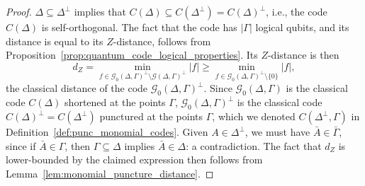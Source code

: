 \documentclass{article}
\begin{document}
\begin{proof}
    $\Delta \subseteq \Delta^\perp$ implies that $C(\Delta) \subseteq C(\Delta^\perp) = C(\Delta)^\perp$, i.e., the code $C(\Delta)$ is self-orthogonal. The fact that the code has $|\Gamma|$ logical qubits, and its distance is equal to its $Z$-distance, follows from Proposition~\ref{prop:quantum_code_logical_properties}. Its $Z$-distance is then
    \begin{equation}
        d_Z = \min_{f \in \mathcal{G}_0(\Delta, \Gamma)^\perp \setminus \mathcal{G}(\Delta, \Gamma)^\perp}|f| \geq \min_{f \in \mathcal{G}_0(\Delta, \Gamma)^\perp \setminus\{0\}}|f|,
    \end{equation}
    the classical distance of the code $\mathcal{G}_0(\Delta, \Gamma)^\perp$. Since $\mathcal{G}_0(\Delta, \Gamma)$ is the classical code $C(\Delta)$ shortened at the points $\Gamma$, $\mathcal{G}_0(\Delta, \Gamma)^\perp$ is the classical code $C(\Delta)^\perp = C(\Delta^\perp)$ punctured at the points $\Gamma$, which we denoted $C(\Delta^\perp, \Gamma)$ in Definition~\ref{def:punc_monomial_codes}. Given $A \in \Delta^\perp$, we must have $\bar{A} \in \bar{\Gamma}$, since if $\bar{A} \in \Gamma$, then $\Gamma \subseteq \Delta$ implies $\bar{A} \in \Delta$: a contradiction. The fact that $d_Z$ is lower-bounded by the claimed expression then follows from Lemma~\ref{lem:monomial_puncture_distance}.


\end{proof}
\end{document}
